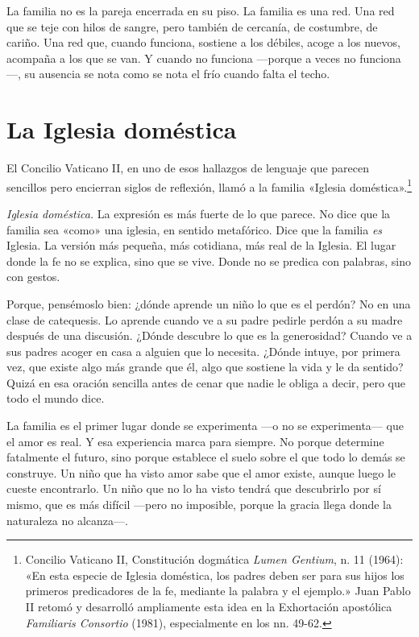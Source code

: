 La familia no es la pareja encerrada en su piso. La familia es una red. Una red que se teje con hilos de sangre, pero también de cercanía, de costumbre, de cariño. Una red que, cuando funciona, sostiene a los débiles, acoge a los nuevos, acompaña a los que se van. Y cuando no funciona ---porque a veces no funciona---, su ausencia se nota como se nota el frío cuando falta el techo.

\section{La Iglesia doméstica}

El Concilio Vaticano II, en uno de esos hallazgos de lenguaje que parecen sencillos pero encierran siglos de reflexión, llamó a la familia «Iglesia doméstica».\footnote{Concilio Vaticano II, Constitución dogmática \textit{Lumen Gentium}, n. 11 (1964): «En esta especie de Iglesia doméstica, los padres deben ser para sus hijos los primeros predicadores de la fe, mediante la palabra y el ejemplo.» Juan Pablo II retomó y desarrolló ampliamente esta idea en la Exhortación apostólica \textit{Familiaris Consortio} (1981), especialmente en los nn. 49-62.}

\textit{Iglesia doméstica.} La expresión es más fuerte de lo que parece. No dice que la familia sea «como» una iglesia, en sentido metafórico. Dice que la familia \emph{es} Iglesia. La versión más pequeña, más cotidiana, más real de la Iglesia. El lugar donde la fe no se explica, sino que se vive. Donde no se predica con palabras, sino con gestos.

Porque, pensémoslo bien: ¿dónde aprende un niño lo que es el perdón? No en una clase de catequesis. Lo aprende cuando ve a su padre pedirle perdón a su madre después de una discusión. ¿Dónde descubre lo que es la generosidad? Cuando ve a sus padres acoger en casa a alguien que lo necesita. ¿Dónde intuye, por primera vez, que existe algo más grande que él, algo que sostiene la vida y le da sentido? Quizá en esa oración sencilla antes de cenar que nadie le obliga a decir, pero que todo el mundo dice.

La familia es el primer lugar donde se experimenta ---o no se experimenta--- que el amor es real. Y esa experiencia marca para siempre. No porque determine fatalmente el futuro, sino porque establece el suelo sobre el que todo lo demás se construye. Un niño que ha visto amor sabe que el amor existe, aunque luego le cueste encontrarlo. Un niño que no lo ha visto tendrá que descubrirlo por sí mismo, que es más difícil ---pero no imposible, porque la gracia llega donde la naturaleza no alcanza---.

